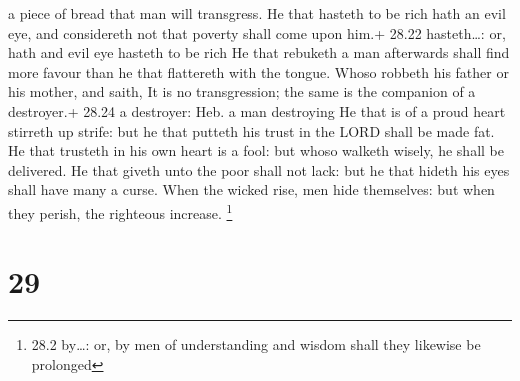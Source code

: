 a piece of bread that man will transgress.  He that hasteth
to be rich hath an evil eye, and considereth not that poverty shall come
upon him.+ 28.22 hasteth\ldots: or, hath and evil eye hasteth to be rich
 He that rebuketh a man afterwards shall find more favour
than he that flattereth with the tongue.  Whoso robbeth his
father or his mother, and saith, It is no transgression; the same is the
companion of a destroyer.+ 28.24 a destroyer: Heb. a man destroying
 He that is of a proud heart stirreth up strife: but he
that putteth his trust in the LORD shall be made fat.  He
that trusteth in his own heart is a fool: but whoso walketh wisely, he
shall be delivered.  He that giveth unto the poor shall not
lack: but he that hideth his eyes shall have many a curse. 
When the wicked rise, men hide themselves: but when they perish, the
righteous increase. \footnote{28.2 by\ldots: or, by men of understanding
  and wisdom shall they likewise be prolonged}

\hypertarget{section-28}{%
\section{29}\label{section-28}}

